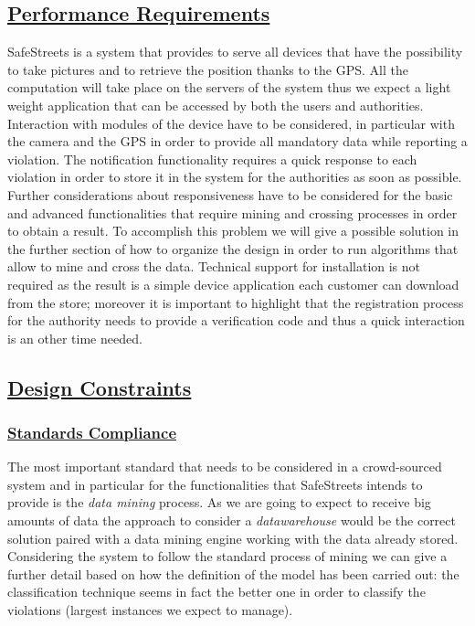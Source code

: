 	\subsection[Performance Requirements]{\hyperlink{toc}{Performance Requirements}}
		SafeStreets is a system that provides to serve all devices that have the possibility to take pictures and to retrieve the position thanks to the GPS. All the computation will take place on the servers of the system thus we expect a light weight application that can be accessed by both the users and authorities. Interaction with modules of the device have to be considered, in particular with the camera and the GPS in order to provide all mandatory data while reporting a violation. The notification functionality requires a quick response to each violation in order to store it in the system for the authorities as soon as possible. Further considerations about responsiveness have to be considered for the basic and advanced functionalities that require mining and crossing processes in order to obtain a result. To accomplish this problem we will give a possible solution in the further section of how to organize the design in order to run algorithms that allow to mine and cross the data. Technical support for installation is not required as the result is a simple device application each customer can download from the store; moreover it is important to highlight that the registration process for the authority needs to provide a verification code and thus a quick interaction is an other time needed.
	
	\subsection[Design Constraints]{\hyperlink{toc}{Design Constraints}}
		\subsubsection[Standards Compliance]{\hyperlink{toc}{Standards Compliance}}
			The most important standard that needs to be considered in a crowd-sourced system and in particular for the functionalities that SafeStreets intends to provide is the \emph{data mining} process. As we are going to expect to receive big amounts of data the approach to consider a \emph{datawarehouse} would be the correct solution paired with a data mining engine working with the data already stored. Considering the system to follow the standard process of mining we can give a further detail based on how the definition of the model has been carried out: the classification technique seems in fact the better one in order to classify the violations (largest instances we expect to manage). 
